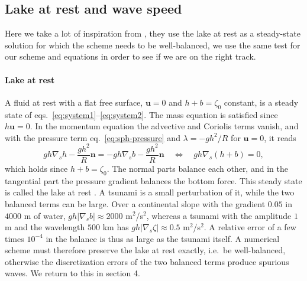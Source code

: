 \subsection{Lake at rest and wave speed}\label{sec:sph-rest}
Here we take a lot of inspiration from \cite{bonev2018discontinuous}, they use the lake at rest as a steady-state solution for which the scheme needs to be well-balanced, we use the same test for our scheme and equations in order to see if we are on the right track.

\paragraph{Lake at rest}
A fluid at rest with a flat free surface, $\mathbf{u} = 0$ and $h + b = \zeta_0$ constant, is a steady state of eqs.~\eqref{eq:system1}--\eqref{eq:system2}. The mass equation is satisfied since $h\mathbf{u} = 0$. In the momentum equation the advective and Coriolis terms vanish, and with the pressure term eq.~\eqref{eq:sph-pressure} and $\lambda = -gh^2/R$ for $\mathbf{u} = 0$, it reads
\begin{equation*}
    gh\nabla_s h - \frac{gh^2}{R}\mathbf{n} = -gh\nabla_s b - \frac{gh^2}{R}\mathbf{n}
    \quad\Leftrightarrow\quad gh\nabla_s(h + b) = 0,
\end{equation*}
which holds since $h + b = \zeta_0$. The normal parts balance each other, and in the tangential part the pressure gradient balances the bottom force. This steady state is called the lake at rest \cite{bonev2018discontinuous}. A tsunami is a small perturbation of it, while the two balanced terms can be large. Over a continental slope with the gradient $0.05$ in $4000$ m of water, $gh|\nabla_s b|\approx2000$ m$^2$/s$^2$, whereas a tsunami with the amplitude $1$ m and the wavelength $500$ km has $gh|\nabla_s\zeta|\approx0.5$ m$^2$/s$^2$. A relative error of a few times $10^{-4}$ in the balance is thus as large as the tsunami itself. A numerical scheme must therefore preserve the lake at rest exactly, i.e.\ be well-balanced, otherwise the discretization errors of the two balanced terms produce spurious waves. We return to this in section 4.

